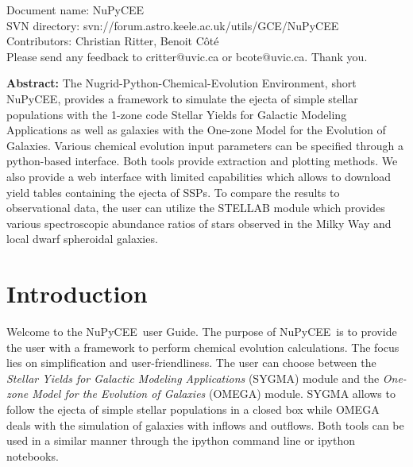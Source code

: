 \renewcommand{\ndoctitle}{NuPyCEE} 
\renewcommand{\ndocname}{NuPyCEE}                      
\renewcommand{\svndir}{svn://forum.astro.keele.ac.uk/utils/GCE/NuPyCEE}  
\renewcommand{\ndoccontribs}{Christian Ritter, Benoit C\^ot\'e}

%

Document name: \ndocname \\
SVN directory: \svndir\\
Contributors: \ndoccontribs\\
Please send any feedback to critter@uvic.ca or bcote@uvic.ca. Thank you.


{  \textbf{Abstract:} %
\noindent The Nugrid-Python-Chemical-Evolution Environment, short NuPyCEE, provides
a framework to simulate the ejecta of simple stellar populations with the 1-zone code
Stellar Yields for Galactic Modeling Applications as well as galaxies
with the One-zone Model for the Evolution of Galaxies.
Various chemical evolution input parameters can be specified through a python-based interface.
Both tools provide extraction and plotting methods.
We also provide a web interface with limited capabilities which allows to download
yield tables containing the ejecta of SSPs. 
To compare the results to observational data, the user can utilize the STELLAB module
which provides various spectroscopic abundance ratios of stars observed in the 
Milky Way and local dwarf spheroidal galaxies.
}



\section{Introduction}
\index{\ndocname}
Welcome to the \ndocname\ user Guide. The purpose of \ndocname\ is to 
provide the user with a framework to perform chemical evolution calculations.
The focus lies on simplification and user-friendliness.
The user can choose between the \textit{Stellar Yields for Galactic Modeling Applications} (SYGMA) module 
and the \textit{One-zone Model for the Evolution of Galaxies} (OMEGA) module.
SYGMA allows to follow the ejecta of simple stellar populations in a closed box while OMEGA deals with
the simulation of galaxies with inflows and outflows.
Both tools can be used in a similar manner through the ipython command line or
ipython notebooks.


